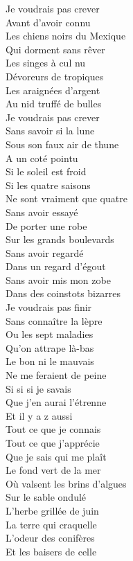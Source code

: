 Je voudrais pas crever\\
Avant d'avoir connu\\
Les chiens noirs du Mexique\\
Qui dorment sans rêver\\
Les singes à cul nu\\
Dévoreurs de tropiques\\
Les araignées d'argent\\
Au nid truffé de bulles\\
Je voudrais pas crever\\
Sans savoir si la lune\\
Sous son faux air de thune\\
A un coté pointu\\
Si le soleil est froid\\
Si les quatre saisons\\
Ne sont vraiment que quatre\\
Sans avoir essayé\\
De porter une robe\\
Sur les grands boulevards\\
Sans avoir regardé\\
Dans un regard d'égout\\
Sans avoir mis mon zobe\\
Dans des coinstots bizarres\\
Je voudrais pas finir\\
Sans connaître la lèpre\\
Ou les sept maladies\\
Qu'on attrape là-bas\\
Le bon ni le mauvais\\
Ne me feraient de peine\\
Si si si je savais\\
Que j'en aurai l'étrenne\\
Et il y a z aussi\\
Tout ce que je connais\\
Tout ce que j'apprécie\\
Que je sais qui me plaît\\
Le fond vert de la mer\\
Où valsent les brins d'algues\\
Sur le sable ondulé\\
L'herbe grillée de juin\\
La terre qui craquelle\\
L'odeur des conifères\\
Et les baisers de celle\\
